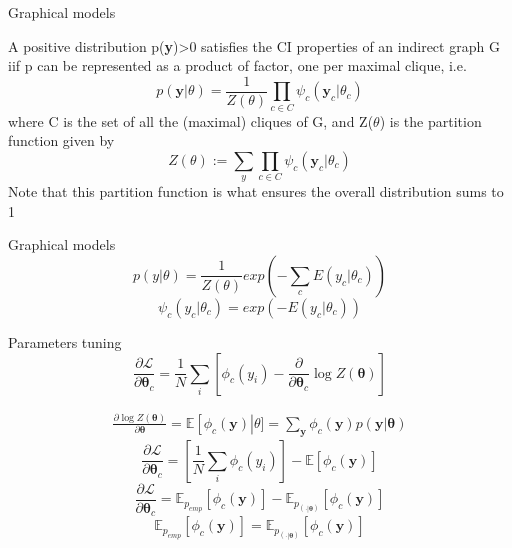 \documentclass{beamer}
\begin{document}
\begin{frame}{Graphical models}
\begin{theorem}
A positive distribution p(\textbf{y})>0 satisfies the CI properties of an indirect graph G iif p can be represented as a product of factor, one per maximal clique,  i.e.
\begin{equation}
p(\textbf{y}|\theta)= \dfrac{1}{Z(\theta)}\prod_{c \in C }\psi_{c}(\textbf{y}_{c}|\theta_{c})
\end{equation}
where C is the set of all the (maximal) cliques of G,  and Z($\theta$) is the partition function given by 
\begin{equation}
Z(\theta):= \sum_{y}\prod_{c\in C}\psi_{c}(\textbf{y}_{c}|\theta_{c})
\end{equation}
Note that this partition function is what ensures the overall distribution sums to 1
\end{theorem}
\end{frame}


\begin{frame}{Graphical models}
\begin{equation}
p(y|\theta)=\dfrac{1}{Z(\theta)} exp\left(-\sum_{c}E(y_{c}|\theta_{c})\right)
\end{equation}
\begin{equation}
\psi_{c}(y_{c}|\theta_{c})=exp\left(-E(y_{c}|\theta_{c})\right)
\end{equation}
\end{frame}

\begin{frame}{Parameters tuning}
\begin{equation}
\frac{\partial\mathcal{L}}{\partial\boldsymbol{\theta}_{c}}=\frac{1}{N}\sum_{i}\left[\phi_{c}(y_{i})-\frac{\partial}{\partial\boldsymbol{\theta}_{c}}\log Z(\boldsymbol{\theta})\right]
\end{equation}

\begin{equation}
\begin{split}
\frac{\partial \log Z(\boldsymbol{\theta})}{\partial\boldsymbol{\theta}}=\mathbb{E}\left[\phi_{c}(\textbf{y})\right|\theta]= \sum_{\textbf{y}}\phi_{c}(\textbf{y})p(\textbf{y}|\boldsymbol{\theta})
\end{split}
\end{equation}
\begin{equation}
\frac{\partial\mathcal{L}}{\partial\boldsymbol{\theta}_{c}}=\left[\frac{1}{N}\sum_{i}\phi_{c}(y_{i})\right]-\mathbb{E}\left[\phi_{c}(\textbf{y})\right]
\end{equation}
\begin{equation}
\frac{\partial\mathcal{L}}{\partial\boldsymbol{\theta}_{c}}=\mathbb{E}_{p_{emp}}\left[\phi_{c}(\textbf{y})\right]-\mathbb{E}_{p_{(\cdot|\boldsymbol{\theta})}}\left[\phi_{c}(\textbf{y})\right]
\end{equation}
\begin{equation}
\mathbb{E}_{p_{emp}}\left[\phi_{c}(\textbf{y})\right]=\mathbb{E}_{p_{(\cdot|\boldsymbol{\theta})}}\left[\phi_{c}(\textbf{y})\right]
\end{equation}
\end{frame}
\end{document}
